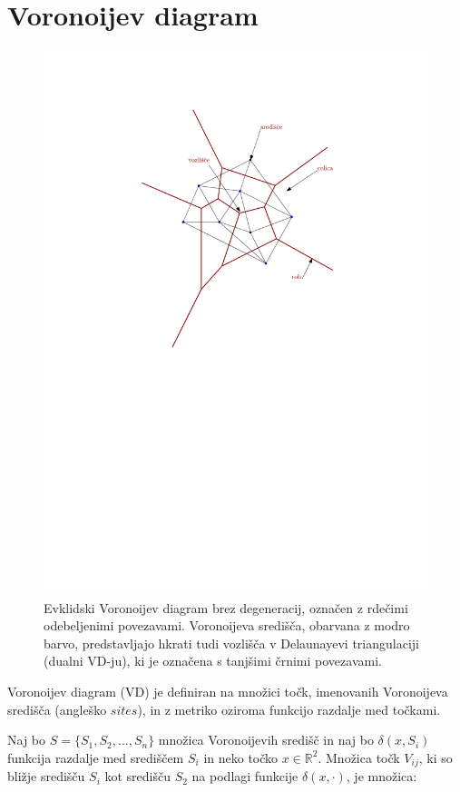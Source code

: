 \documentclass[a4paper, 12pt]{book}
\begin{document}
\section{Voronoijev diagram}
\begin{figure}
\centerline{\includegraphics[scale=0.8]{pics/voronoi-dt2.pdf}}
\caption{Evklidski Voronoijev diagram brez degeneracij, označen z rdečimi odebeljenimi povezavami. Voronoijeva središča, obarvana z modro barvo, predstavljajo hkrati tudi vozlišča v Delaunayevi triangulaciji (dualni VD-ju), ki je označena s tanjšimi črnimi povezavami.}
\label{vd}
\end{figure}

Voronoijev diagram (VD) je definiran na množici točk, imenovanih Voronoijeva središča (angleško $sites$), in z metriko oziroma funkcijo razdalje med točkami.

Naj bo $S = \{S_1,S_2,...,S_n\}$ množica Voronoijevih središč in naj bo $\delta(x,S_i)$ funkcija razdalje med središčem $S_i$ in neko točko $x \in \mathbb{R}^2$. Množica točk $V_{ij}$, ki so bližje središču $S_i$ kot središču $S_2$ na podlagi funkcije $\delta(x,\cdot)$, je množica:
\end{document}
